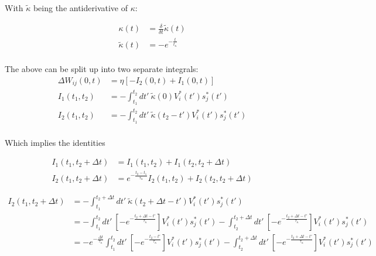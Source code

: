 With $\tilde{\kappa}$ being the antiderivative of $\kappa$:

\begin{align}
  \kappa(t)         & = \frac{\delta}{\delta t} \tilde{\kappa}(t) \\
  \tilde{\kappa}(t) & = - e^{-\frac{t}{t_{\kappa}}}               \\
\end{align}

The above can be split up into two separate integrals:
\begin{align}
  \Delta W_{ij}(0,t) & =\eta \left[ -I_2 (0, t) + I_1(0,t) \right]                                      \\
  I_1(t_1, t_2)      & = - \int_{t_1}^{t_2} dt' \ \tilde{\kappa} (0) V_i^\ast (t') s_j^\ast (t')        \\
  I_2(t_1, t_2)      & = - \int_{t_1}^{t_2} dt' \ \tilde{\kappa} (t_2 - t') V_i^\ast (t') s_j^\ast (t') \\
\end{align}

Which implies the identities

\begin{align}
  I_1(t_1, t_2 + \Delta t) & = I_1 (t_1, t_2) + I_1 (t_2, t_2 + \Delta t)                                       \\
  I_2(t_1, t_2 + \Delta t) & = e^{- \frac{t_2 - t_1}{\tau_{\kappa}}} I_2 (t_1, t_2) + I_2 (t_2, t_2 + \Delta t)
\end{align}


\begin{align}
  I_2 (t_1, t_2 + \Delta t) & = -\int_{t_1}^{t_2 + \Delta t} dt' \ \tilde{\kappa} (t_2 + \Delta t - t') V_i^\ast (t') s_j^\ast (t')                                        \\
                            & = -\int_{t_1}^{t_2} dt' \ \left[ -e^{- \frac{t_2 + \Delta t - t'}{\tau_\kappa}} \right] V_i^\ast (t') s_j^\ast (t')
  -\int_{t_2}^{t_2 + \Delta t} dt' \ \left[ -e^{- \frac{t_2 + \Delta t - t'}{\tau_\kappa}} \right] V_i^\ast (t') s_j^\ast (t')                                             \\
                            & = -e^{- \frac{ \Delta t}{\tau_\kappa}} \int_{t_1}^{t_2} dt' \ \left[ -e^{- \frac{t_2 - t'}{\tau_\kappa}} \right] V_i^\ast (t') s_j^\ast (t')
  -\int_{t_2}^{t_2 + \Delta t} dt' \ \left[ -e^{- \frac{t_2 + \Delta t - t'}{\tau_\kappa}} \right] V_i^\ast (t') s_j^\ast (t')
\end{align}


